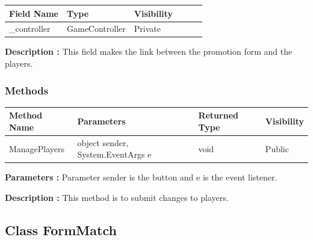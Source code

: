 \documentclass[12pt]{article}
\begin{document}
    \begin{table}[H]
        \begin{tabular}{llllll}
            \hline
            \multicolumn{1}{|l|}{\cellcolor[HTML]{EFEFEF}\textbf{Field Name}} & \multicolumn{1}{l|}{\cellcolor[HTML]{EFEFEF}\textbf{Type}} & \multicolumn{1}{l|}{\cellcolor[HTML]{EFEFEF}\textbf{Visibility}} \\ \hline
            \multicolumn{1}{|l|}{\_controller}                                & \multicolumn{1}{l|}{GameController}                        & \multicolumn{1}{l|}{Private}                                     \\ \hline
        \end{tabular}
    \end{table}

    \textbf{Description :} This field makes the link between the promotion form and the players.

    \subsubsection{Methods}

    \begin{table}[H]
        \begin{tabular}{|l|l|l|l|}
            \hline
            \rowcolor[HTML]{EFEFEF}
            \cellcolor[HTML]{EFEFEF}\textbf{Method Name} & \textbf{Parameters}               & \textbf{Returned Type} & \textbf{Visibility} \\ \hline
            ManagePlayers                                & object sender, System.EventArgs e & void                   & Public              \\ \hline
        \end{tabular}
    \end{table}

    \textbf{Parameters :} Parameter sender is the button and e is the event listener.

    \textbf{Description :} This method is to submit changes to players.

    \newpage


    \subsection{Class FormMatch}
\end{document}
